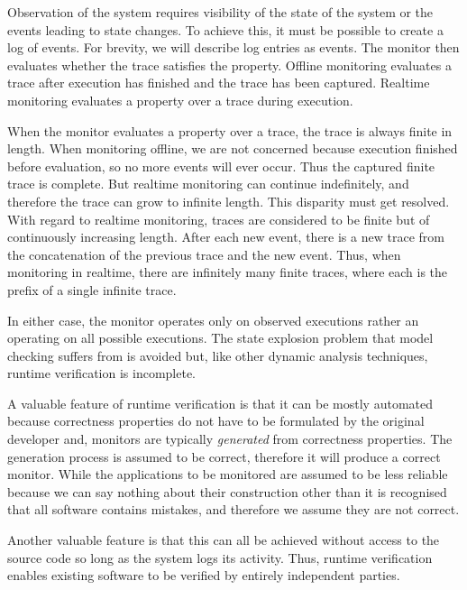 Observation of the system requires visibility of the state of the system or the events leading to state changes.  To achieve this, it must be possible to create a log of events.  For brevity, we will describe log entries as events.  The monitor then evaluates whether the trace satisfies the property.  Offline monitoring evaluates a trace after execution has finished and the trace has been captured.  Realtime monitoring evaluates a property over a trace during execution.


When the monitor evaluates a property over a trace, the trace is always finite in length.  When monitoring offline, we are not concerned because execution finished before evaluation, so no more events will ever occur.  Thus the captured finite trace is complete.  But realtime monitoring can continue indefinitely, and therefore the trace can grow to infinite length.   This disparity must get resolved.  With regard to realtime monitoring, traces are considered to be finite but of continuously increasing length.  After each new event, there is a new trace from the concatenation of the previous trace and the new event.  Thus, when monitoring in realtime, there are infinitely many finite traces, where each is the prefix of a single infinite trace.

In either case, the monitor operates only on observed executions rather an operating on all possible executions.  The state explosion problem that model checking suffers from is avoided but, like other dynamic analysis techniques, runtime verification is incomplete.

A valuable feature of runtime verification is that it can be mostly automated because correctness properties do not have to be formulated by the original developer and, monitors are typically \textit{generated} from correctness properties.  The generation process is assumed to be correct, therefore it will produce a correct monitor.  While the applications to be monitored are assumed to be less reliable because we can say nothing about their construction other than it is recognised that all software contains mistakes, and therefore we assume they are not correct.

Another valuable feature is that this can all be achieved without access to the source code so long as the system logs its activity.  Thus, runtime verification enables existing software to be verified by entirely independent parties.\\


